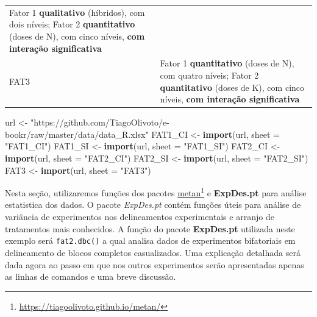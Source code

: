\documentclass[
]{book}
\newenvironment{Shaded}{\begin{snugshade}}{\end{snugshade}}
\newcommand{\DataTypeTok}[1]{\textcolor[rgb]{0.13,0.29,0.53}{#1}}
\newcommand{\KeywordTok}[1]{\textcolor[rgb]{0.13,0.29,0.53}{\textbf{#1}}}
\newcommand{\NormalTok}[1]{#1}
\newcommand{\StringTok}[1]{\textcolor[rgb]{0.31,0.60,0.02}{#1}}
\begin{document}
\begin{longtable}[]{@{}ll@{}}
\begin{minipage}[t]{0.84\columnwidth}
Fator 1 \textbf{qualitativo} (híbridos), com dois níveis; Fator 2 \textbf{quantitativo} (doses de N), com cinco níveis, \textbf{com interação significativa}\strut
\end{minipage}\tabularnewline
\begin{minipage}[t]{0.10\columnwidth}\raggedright
FAT3\strut
\end{minipage} & \begin{minipage}[t]{0.84\columnwidth}\raggedright
Fator 1 \textbf{quantitativo} (doses de N), com quatro níveis; Fator 2 \textbf{quantitativo} (doses de K), com cinco níveis, \textbf{com interação significativa}\strut
\end{minipage}\tabularnewline
\bottomrule
\end{longtable}

\begin{Shaded}
\begin{Highlighting}[]
\NormalTok{url <-}\StringTok{ "https://github.com/TiagoOlivoto/e-bookr/raw/master/data/data_R.xlsx"}
\NormalTok{FAT1_CI <-}\StringTok{ }\KeywordTok{import}\NormalTok{(url, }\DataTypeTok{sheet =} \StringTok{"FAT1_CI"}\NormalTok{)}
\NormalTok{FAT1_SI <-}\StringTok{ }\KeywordTok{import}\NormalTok{(url, }\DataTypeTok{sheet =} \StringTok{"FAT1_SI"}\NormalTok{)}
\NormalTok{FAT2_CI <-}\StringTok{ }\KeywordTok{import}\NormalTok{(url, }\DataTypeTok{sheet =} \StringTok{"FAT2_CI"}\NormalTok{)}
\NormalTok{FAT2_SI <-}\StringTok{ }\KeywordTok{import}\NormalTok{(url, }\DataTypeTok{sheet =} \StringTok{"FAT2_SI"}\NormalTok{)}
\NormalTok{FAT3 <-}\StringTok{ }\KeywordTok{import}\NormalTok{(url, }\DataTypeTok{sheet =} \StringTok{"FAT3"}\NormalTok{)}
\end{Highlighting}
\end{Shaded}

Nesta seção, utilizaremos funções dos pacotes \href{https://tiagoolivoto.github.io/metan/}{metan}\footnote{\url{https://tiagoolivoto.github.io/metan/}} e \textbf{ExpDes.pt}  \citep{Ferreira2018} para análise estatistica dos dados. O pacote \emph{ExpDes.pt} contém funções úteis para análise de variância de experimentos nos delineamentos experimentais e arranjo de tratamentos mais conhecidos. A função do pacote \textbf{ExpDes.pt} utilizada neste exemplo será \texttt{fat2.dbc()}  a qual analisa dados de experimentos bifatoriais em delineamento de blocos completos casualizados. Uma explicação detalhada será dada agora ao passo em que nos outros experimentos serão apresentadas apenas as linhas de comandos e uma breve discussão.
\end{document}
